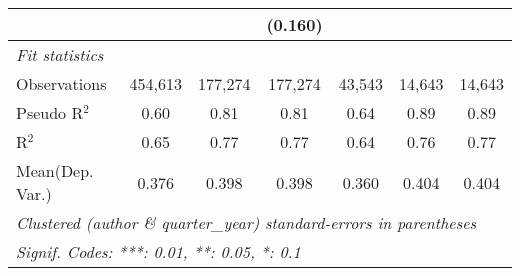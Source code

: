\begin{tabular}{lcccccc}
                        &                &                & (0.160)        &                &                &   \\   
   \midrule
   \emph{Fit statistics}\\
   Observations         & 454,613        & 177,274        & 177,274        & 43,543         & 14,643         & 14,643\\  
   Pseudo R$^2$         & 0.60           & 0.81           & 0.81           & 0.64           & 0.89           & 0.89\\  
   R$^2$                & 0.65           & 0.77           & 0.77           & 0.64           & 0.76           & 0.77\\  
Mean(Dep. Var.) & 0.376 & 0.398 & 0.398 & 0.360 & 0.404 & 0.404 \\
   \midrule \midrule
   \multicolumn{7}{l}{\emph{Clustered (author \& quarter\_year) standard-errors in parentheses}}\\
   \multicolumn{7}{l}{\emph{Signif. Codes: ***: 0.01, **: 0.05, *: 0.1}}\\
\end{tabular}
\par\endgroup
